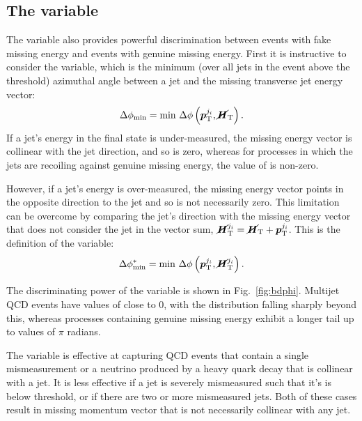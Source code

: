 \subsection{The \bdphi variable}

The \bdphi variable also provides powerful discrimination between events with 
fake missing energy and events with genuine missing energy.
First it is instructive to consider the \dphimin variable, which is the minimum 
(over all jets in the event above the \pt threshold) azimuthal angle between a 
jet and the missing transverse jet energy vector:
\begin{equation}
\Delta\phi_{\mathrm{min}} = \mathrm{min}~\Delta\phi\left(\bm{p}_{\mathrm 
T}^{j_i},\bm{\cancel{H}}_\mathrm{T}\right).
\end{equation}
If a jet's energy in the final state is under-measured, the missing energy 
vector is collinear with the jet direction, and so \dphimin is zero, whereas 
for processes in which the jets are recoiling against genuine missing energy, 
the value of \dphimin is non-zero.

However, if a jet's energy is over-measured, the missing energy vector points 
in the opposite direction to the jet and so \dphimin is not necessarily zero. 
This limitation can be overcome by comparing the jet's direction with the 
missing energy vector that does not consider the jet in the vector sum, 
$\bm{\cancel{H}}_\mathrm{T}^{j_i} = \bm{\cancel{H}}_\mathrm{T} + 
\bm{p}_{\mathrm T}^{j_i}$. This 
is the 
definition of the 
\bdphi variable:
\begin{equation}
\Delta\phi^{*}_{\mathrm{min}} = \mathrm{min}~\Delta\phi\left(\bm{p}_{\mathrm 
	T}^{j_i},\bm{\cancel{H}}_\mathrm{T}^{j_i}\right).
\end{equation}

The discriminating power of the \bdphi variable is shown in 
Fig.~\ref{fig:bdphi}. Multijet QCD events have values of \bdphi close to 0, 
with the distribution falling sharply beyond this, 
whereas processes containing genuine missing energy exhibit a longer tail up to 
values of $\pi$ radians.

The \bdphi variable is effective at capturing QCD events that contain a single 
mismeasurement or a neutrino produced by a heavy quark decay that is collinear 
with a jet. It is less effective if a jet is severely mismeasured such 
that it's \pt is below threshold, or if there are two or more mismeasured jets. 
Both of these cases result in missing momentum vector that is not necessarily 
collinear with any jet.

